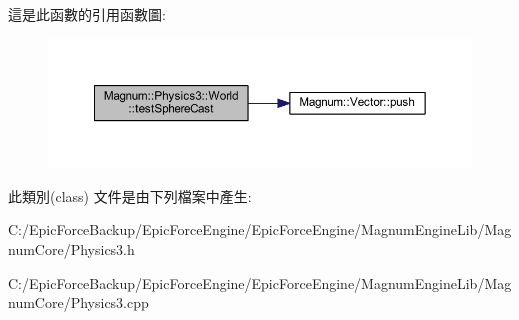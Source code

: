 這是此函數的引用函數圖\+:\nopagebreak
\begin{figure}[H]
\begin{center}
\leavevmode
\includegraphics[width=350pt]{class_magnum_1_1_physics3_1_1_world_ad482e19245dd876fce45f127264ab862_cgraph}
\end{center}
\end{figure}




此類別(class) 文件是由下列檔案中產生\+:\begin{DoxyCompactItemize}
\item 
C\+:/\+Epic\+Force\+Backup/\+Epic\+Force\+Engine/\+Epic\+Force\+Engine/\+Magnum\+Engine\+Lib/\+Magnum\+Core/Physics3.\+h\item 
C\+:/\+Epic\+Force\+Backup/\+Epic\+Force\+Engine/\+Epic\+Force\+Engine/\+Magnum\+Engine\+Lib/\+Magnum\+Core/Physics3.\+cpp\end{DoxyCompactItemize}

